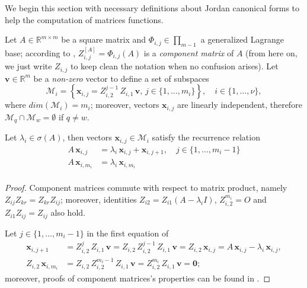 
We begin this section with necessary definitions about Jordan canonical forms
to help the computation of matrices functions.

Let $A\in\mathbb{R}^{m\times m}$ be a square matrix and $\Phi_{i,j}
\in\prod_{m-1}$ a generalized Lagrange base; according to \citep{LT2002},
$Z_{i,j}^{[A]} = \Phi_{i,j}(A)$ is a \textit{component matrix} of $A$ (from
here on, we just write $Z_{i,j}$ to keep clean the notation when no confusion
arises). Let $\boldsymbol{v}\in\mathbb{R}^{m}$ be a \textit{non-zero} vector to
define a set of subspaces
\begin{displaymath}
\mathcal{M}_{i} = \left\lbrace \boldsymbol{x}_{i,j} = Z_{i,2}^{j-1}\,Z_{i,1}\,\boldsymbol{v},\,j\in\lbrace1,\ldots,m_{i}\rbrace\right\rbrace, \quad i\in \lbrace 1,\ldots,\nu \rbrace,
\end{displaymath}
where $dim(\mathcal{M}_{i})=m_{i}$; moreover, vectors $\boldsymbol{x}_{i,j}$ are
linearly independent, therefore $\mathcal{M}_{q}\cap\mathcal{M}_{w}=\emptyset$ if $q\neq w$.
\begin{lemma}
Let $\lambda_{i}\in\sigma(A)$, then vectors
$\boldsymbol{x}_{i,j}\in\mathcal{M}_{i}$ satisfy the recurrence relation
\begin{displaymath}
\begin{split}
A\,\boldsymbol{x}_{i,j} &= \lambda_{i}\,\boldsymbol{x}_{i,j} + \boldsymbol{x}_{i,j+1} , \quad j\in \lbrace 1,\ldots,m_{i}-1 \rbrace  \\
A\,\boldsymbol{x}_{i,m_{i}} &= \lambda_{i}\,\boldsymbol{x}_{i,m_{i}} \\
\end{split}
\end{displaymath}
\end{lemma}
\begin{proof}
Component matrices commute with respect to matrix product, namely
$Z_{ij}Z_{kr}= Z_{kr}Z_{ij}$; moreover, identities $Z_{i2} =
Z_{i1}(A-\lambda_{i}I)$, $Z_{i,2}^{m_{i}}=O$ and $Z_{i1}Z_{ij}=Z_{ij}$ also
hold. 

Let $ j\in \lbrace 1,\ldots,m_{i}-1 \rbrace $ in the first equation of
\begin{displaymath}
\begin{split}
\boldsymbol{x}_{i,j+1} &= Z_{i,2}^{j}\,Z_{i,1}\,\boldsymbol{v} = Z_{i,2}\,Z_{i,2}^{j-1}\,Z_{i,1}\,\boldsymbol{v} =  Z_{i,2}\,\boldsymbol{x}_{i,j}=A\,\boldsymbol{x}_{i,j} - \lambda_{i}\,\boldsymbol{x}_{i,j},  \\
Z_{i,2}\,\boldsymbol{x}_{i,m_{i}} &=  Z_{i,2}\,Z_{i,2}^{m_{i}-1}\,Z_{i,1}\,\boldsymbol{v} = Z_{i,2}^{m_{i}}\,Z_{i,1}\,\boldsymbol{v} = \boldsymbol{0};
\end{split}
\end{displaymath}
moreover, proofs of component matrices's properties can be found in \citep{BT1998, LT2002}.
\end{proof}
